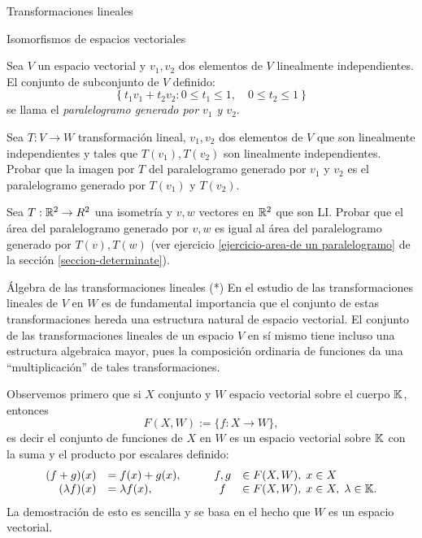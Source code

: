 \begin{chapter}{Transformaciones lineales}
\begin{section}{Isomorfismos de espacios vectoriales}
\begin{enumex}
            \item Sea $V$ un espacio vectorial y $v_1,v_2$  dos elementos de $V$ linealmente independientes. El conjunto de subconjunto de $V$ definido: 
            $$
            \left\{ t_1v_1 + t_2v_2: 0 \le t_1 \le 1, \quad 0 \le t_2 \le 1 \right\}
            $$
            se llama el \textit{paralelogramo generado por $v_1$ y $v_2$}. 
            \begin{enumex}
                \item Sea $T: V \to W$ transformación lineal, $v_1,v_2$  dos elementos de $V$ que son linealmente independientes y  tales que $T(v_1),T(v_2)$  son linealmente independientes. Probar que la imagen por $T$ del paralelogramo generado por $v_1$ y $v_2$ es el paralelogramo generado por $T(v_1)$ y $T(v_2)$. 
                \item Sea $T: \mathbb R^2 \to R^2$ una isometría  y $v,w$ vectores en $\mathbb R^2$ que son LI. Probar que el área del paralelogramo generado  por $v,w$ es igual al área del paralelogramo generado por $T(v),T(w)$ (ver ejercicio \ref{ejercicio-area-de un paralelogramo} de la sección \ref{seccion-determinate}).  
            \end{enumex}   
    \end{enumex}

    
        \end{section}
    
        \begin{section}{\'Algebra de las transformaciones lineales (*)}\label{seccion-algebra-de-las-transformaciones-lineales}
            En el estudio de las transformaciones lineales de $V$ en $W$ es de fundamental importancia que el conjunto de estas transformaciones hereda una estructura natural de espacio vectorial. El conjunto de las transformaciones lineales de un espacio $V$ en sí mismo tiene incluso una estructura algebraica mayor, pues la composición ordinaria de funciones da una ``multiplicación'' de tales transformaciones. 
            
            
            Observemos primero que si $X$ conjunto y $W$ espacio vectorial sobre el cuerpo $\mathbb K$,  entonces
            $$
            F(X,W) := \{f:X\to W\},
            $$ 
            es decir el conjunto de funciones de $X$ en $W$ es un espacio vectorial sobre $\mathbb K$ con la suma y el producto por escalares definido:
            \begin{equation*}
            \begin{array}{rlcl}
            (f+g)(x) &= f(x)+ g(x),\qquad &f,g& \in F(X,W),\; x \in X\\
            (\lambda f)(x) &= \lambda f(x), & f& \in F(X,W),\; x \in X, \; \lambda \in \mathbb K.
            \end{array}
            \end{equation*}
            La demostración de esto es sencilla y se basa en el hecho que $W$  es un espacio vectorial. 
            

\end{section}
\end{chapter}
